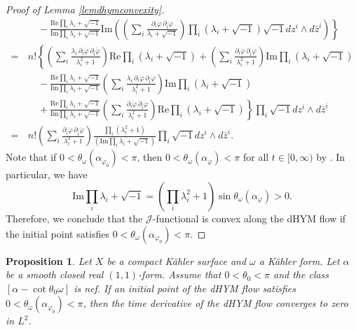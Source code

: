 \documentclass{amsart}
\numberwithin{equation}{section}
\theoremstyle{plain}
\newtheorem{prop}[equation]{Proposition}
\theoremstyle{definition}
\theoremstyle{remark}
\begin{document}
\begin{proof}[Proof of Lemma \ref{lemdhymconvexity}]
\begin{align*}
        &\left. \quad -\frac{\mathrm{Re}\prod_i\lambda_i+\sqrt{-1}}{\mathrm{Im}\prod_i\lambda_i+\sqrt{-1}}\mathrm{Im}\left(\left(\sum_i \frac{\partial_i\dot{\varphi} \, \partial_{\bar{i}}\dot{\varphi}}{\lambda_i+\sqrt{-1}}\right)\prod_i(\lambda_i+\sqrt{-1})\sqrt{-1}dz^i\wedge d\bar{z}^i\right)\right\} \\
        =\, &n!\left\{\left(\sum_i\frac{\lambda_i\, \partial_i\dot{\varphi}\, \partial_{\bar{i}}\dot{\varphi}}{\lambda_i^2+1}\right) \mathrm{Re}\prod_i(\lambda_i+\sqrt{-1}) +\left(\sum_i\frac{\partial_i\dot{\varphi}\, \partial_{\bar{i}}\dot{\varphi}}{\lambda_i^2+1}\right)\mathrm{Im}\prod_i(\lambda_i+\sqrt{-1})\right.\\
        &\left. \quad -\frac{\mathrm{Re}\prod_i\lambda_i+\sqrt{-1}}{\mathrm{Im}\prod_i\lambda_i+\sqrt{-1}}\left(\sum_i\frac{\lambda_i\, \partial_i\dot{\varphi}\, \partial_{\bar{i}}\dot{\varphi}}{\lambda_i^2+1}\right)\mathrm{Im}\prod_i(\lambda_i+\sqrt{-1})\right.\\
        &\left. \quad +\frac{\mathrm{Re}\prod_i\lambda_i+\sqrt{-1}}{\mathrm{Im}\prod_i\lambda_i+\sqrt{-1}} \left(\sum_i\frac{\partial_i\dot{\varphi}\, \partial_{\bar{i}}\dot{\varphi}}{\lambda_i^2+1}\right)\mathrm{Re}\prod_i(\lambda_i+\sqrt{-1})
        \right\}\prod_i \sqrt{-1}dz^i\wedge d\bar{z}^i \\
        = &n!\left( \sum_i \frac{\partial_i\dot{\varphi}\, \partial_{\bar{i}}\dot{\varphi}}{\lambda_i^2+1}\right) \frac{\prod_i(\lambda_i^2+1)}{\left(\mathrm{Im}\prod_i\lambda_i+\sqrt{-1}\right)}\prod_i \sqrt{-1}dz^i\wedge d\bar{z}^i.
    \end{align*}
    Note that if $ 0 < \theta_\omega(\alpha_{\varphi_0})<\pi$, then $0 < \theta_\omega(\alpha_\varphi)< \pi$ for all $t \in [0,\infty)$ by \cite[Lemma 3.2]{FYZ}. In particular, we have
    \begin{equation*}
        \mathrm{Im}\prod_i\lambda_i+\sqrt{-1}=\left(\prod_i\lambda_i^2+1\right)\sin\theta_\omega(\alpha_\varphi)>0.
    \end{equation*}
    Therefore, we conclude that the $\mathcal{J}$-functional is convex along the dHYM flow if the initial point satisfies $0 <\theta_\omega(\alpha_{\varphi_0}) < \pi$.
\end{proof}

\begin{prop}
    Let $X$ be a compact K{\"a}hler surface and $\omega$ a K{\"a}hler form. Let $\alpha$ be a smooth closed real $(1,1)$-form. Assume that $0 <\theta_0 < \pi$ and the class $[\alpha-\cot{\theta_0}\omega]$ is nef. If an initial point of the dHYM flow satisfies $0 < \theta_\omega(\alpha_{\varphi_0}) < \pi$, then the time derivative of the dHYM flow converges to zero in $L^2$.
\end{prop}
\end{document}
